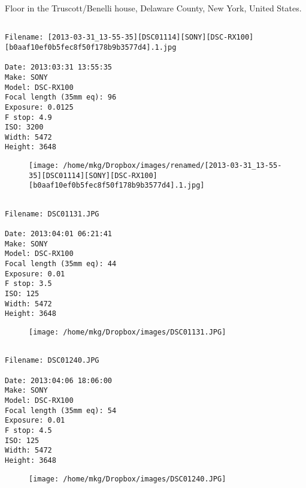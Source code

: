 \clearpage
\onecolumn
\noindent Floor in the Truscott/Benelli house, Delaware County, New York, United States.
\noindent
\begin{lstlisting}

Filename: [2013-03-31_13-55-35][DSC01114][SONY][DSC-RX100][b0aaf10ef0b5fec8f50f178b9b3577d4].1.jpg

Date: 2013:03:31 13:55:35
Make: SONY
Model: DSC-RX100
Focal length (35mm eq): 96
Exposure: 0.0125
F stop: 4.9
ISO: 3200
Width: 5472
Height: 3648
\end{lstlisting}
\clearpage

\begin{figure}
\texttt{[image: /home/mkg/Dropbox/images/renamed/[2013-03-31\_13-55-35][DSC01114][SONY][DSC-RX100][b0aaf10ef0b5fec8f50f178b9b3577d4].1.jpg]}
\end{figure}
    
\clearpage
\onecolumn
\noindent 
\noindent
\begin{lstlisting}

Filename: DSC01131.JPG

Date: 2013:04:01 06:21:41
Make: SONY
Model: DSC-RX100
Focal length (35mm eq): 44
Exposure: 0.01
F stop: 3.5
ISO: 125
Width: 5472
Height: 3648
\end{lstlisting}
\clearpage

\begin{figure}
\texttt{[image: /home/mkg/Dropbox/images/DSC01131.JPG]}
\end{figure}
    
\clearpage
\onecolumn
\noindent 
\noindent
\begin{lstlisting}

Filename: DSC01240.JPG

Date: 2013:04:06 18:06:00
Make: SONY
Model: DSC-RX100
Focal length (35mm eq): 54
Exposure: 0.01
F stop: 4.5
ISO: 125
Width: 5472
Height: 3648
\end{lstlisting}
\clearpage

\begin{figure}
\texttt{[image: /home/mkg/Dropbox/images/DSC01240.JPG]}
\end{figure}
    
